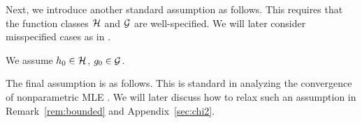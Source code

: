 Next, we introduce another standard assumption as follows. This requires that the function classes $\mathcal{H}$ and $\mathcal{G}$ are well-specified. We will later consider misspecified cases as in . 
\vspace{-2mm}
\begin{assumption}\label{ass: realizability}
    We assume $h_0\in\mathcal{H}$, $g_0\in \mathcal{G}$.
\end{assumption}
\vspace{-2mm}


 



The final assumption is as follows. This is standard in analyzing the convergence of nonparametric MLE \citep[Chap 14, p.g. 476]{wainwright2019high}. We will later discuss how to relax such an assumption in Remark~\ref{rem:bounded} and Appendix~\ref{sec:chi2}. 

